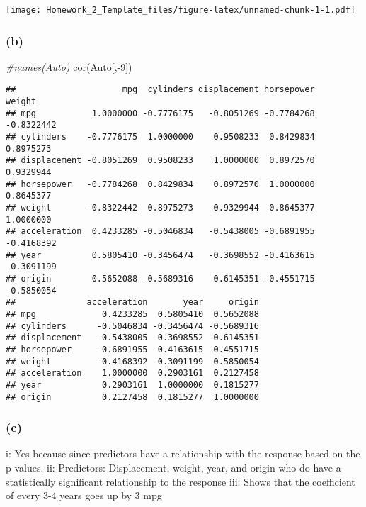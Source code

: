 \documentclass[
]{article}
\newenvironment{Shaded}{\begin{snugshade}}{\end{snugshade}}
\newcommand{\CommentTok}[1]{\textcolor[rgb]{0.56,0.35,0.01}{\textit{#1}}}
\newcommand{\DecValTok}[1]{\textcolor[rgb]{0.00,0.00,0.81}{#1}}
\newcommand{\FunctionTok}[1]{\textcolor[rgb]{0.00,0.00,0.00}{#1}}
\newcommand{\NormalTok}[1]{#1}
\newcommand{\SpecialCharTok}[1]{\textcolor[rgb]{0.00,0.00,0.00}{#1}}
\begin{document}
\texttt{[image: Homework\_2\_Template\_files/figure-latex/unnamed-chunk-1-1.pdf]}

\hypertarget{b-1}{%
\subsubsection{(b)}\label{b-1}}

\begin{Shaded}
\begin{Highlighting}[]
\CommentTok{\#names(Auto)}
\FunctionTok{cor}\NormalTok{(Auto[,}\SpecialCharTok{{-}}\DecValTok{9}\NormalTok{])}
\end{Highlighting}
\end{Shaded}

\begin{verbatim}
##                     mpg  cylinders displacement horsepower     weight
## mpg           1.0000000 -0.7776175   -0.8051269 -0.7784268 -0.8322442
## cylinders    -0.7776175  1.0000000    0.9508233  0.8429834  0.8975273
## displacement -0.8051269  0.9508233    1.0000000  0.8972570  0.9329944
## horsepower   -0.7784268  0.8429834    0.8972570  1.0000000  0.8645377
## weight       -0.8322442  0.8975273    0.9329944  0.8645377  1.0000000
## acceleration  0.4233285 -0.5046834   -0.5438005 -0.6891955 -0.4168392
## year          0.5805410 -0.3456474   -0.3698552 -0.4163615 -0.3091199
## origin        0.5652088 -0.5689316   -0.6145351 -0.4551715 -0.5850054
##              acceleration       year     origin
## mpg             0.4233285  0.5805410  0.5652088
## cylinders      -0.5046834 -0.3456474 -0.5689316
## displacement   -0.5438005 -0.3698552 -0.6145351
## horsepower     -0.6891955 -0.4163615 -0.4551715
## weight         -0.4168392 -0.3091199 -0.5850054
## acceleration    1.0000000  0.2903161  0.2127458
## year            0.2903161  1.0000000  0.1815277
## origin          0.2127458  0.1815277  1.0000000
\end{verbatim}

\hypertarget{c-1}{%
\subsubsection{(c)}\label{c-1}}

i: Yes because since predictors have a relationship with the response
based on the p-values. ii: Predictors: Displacement, weight, year, and
origin who do have a statistically significant relationship to the
response iii: Shows that the coefficient of every 3-4 years goes up by 3
mpg
\end{document}
